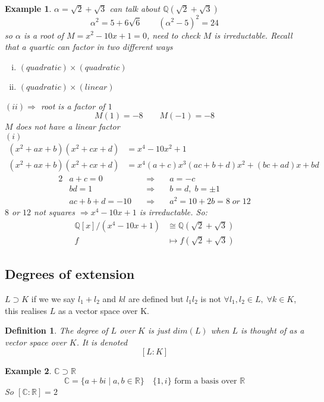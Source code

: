 \documentclass[12pt]{article}
\def\CC{\mathbb{C}}
\def\QQ{\mathbb{Q}}
\def\RR{\mathbb{R}}
\newtheorem{definition}{Definition}[section]
\newtheorem{example}{Example}[section]
\begin{document}
\begin{example}
$\alpha = \sqrt{2} + \sqrt{3}$ can talk about  $\QQ(\sqrt{2} + \sqrt{3})$
\[\alpha^{2} = 5 + 6\sqrt{6} \qquad (\alpha^{2} - 5)^2 = 24\]
so $\alpha$ is a root of $M = x^2 - 10x +1 = 0$, need to check $M$ is irreductable. Recall that a quartic can factor in two different ways
\begin{enumerate}[(i)]
\item $(quadratic) \times (quadratic)$
\item $(quadratic) \times (linear)$\\
\end{enumerate}
$(ii) \Rightarrow$ root is a factor of $1$
\[M(1) = -8 \qquad M(-1) = -8\]
$M$ does not have a linear factor\\
$(i)$
\begin{align*}
(x^2 + a x + b )(x^2 + cx + d) &= x^4 - 10x^2 +1 \\
(x^2 + a x + b )(x^2 + cx + d) &= x^4 (a+c)x^3 (ac + b + d)x^2 + (bc + ad)x + bd
\end{align*}
\begin{alignat*}{2}
&a+c=0 & \quad \Rightarrow \quad &a=-c\\
&bd=1 & \quad \Rightarrow \quad &b=d, \; b=\pm 1\\
&ac+ b+d=-10 & \quad \Rightarrow \quad &a^2 = 10 + 2b = 8\; or\; 12
\end{alignat*}
$8$ or $12$ not squares $\Rightarrow  x^4 - 10x +1$ is irreductable. So:
\begin{align*}
\QQ[x]/( x^4 - 10x +1)  &\cong \QQ(\sqrt{2} + \sqrt{3})\\
f  &\mapsto  f(\sqrt{2} + \sqrt{3})
\end{align*}
\end{example}

\subsection{Degrees of extension} 
$L\supset K$ if we we say $l_1+l_2$ and $kl$ are defined but $l_1l_2$ is not $\forall l_1,l_2 \in L, \; \forall k \in K$, this realises $L$ as a vector space over K.
\begin{definition}
The degree of $L$ over $K$ is just $dim(L)$ when $L$ is thought of as a vector space over $K$. It is denoted
\[ [L:K] \]
\end{definition}

\begin{example}
$\CC \supset \RR$
\[\CC = \{a+bi \;|\; a,b \in \RR \} \quad \{1,i\} \text{ form a basis over } \RR \]
So $[\CC:\RR] = 2$
\end{example}
\end{document}
